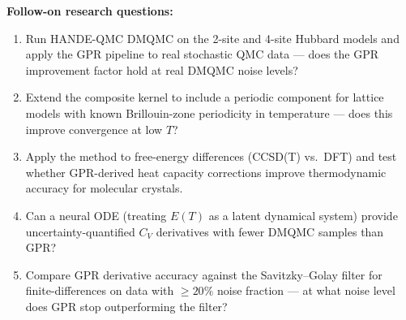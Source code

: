 \noindent\textbf{Follow-on research questions:}
\begin{enumerate}[leftmargin=1.6em,itemsep=0.2em,topsep=0.2em,label=Q\arabic*.]
\item Run HANDE-QMC DMQMC on the 2-site and 4-site Hubbard models and apply the GPR pipeline to real stochastic QMC data --- does the GPR improvement factor hold at real DMQMC noise levels?
\item Extend the composite kernel to include a periodic component for lattice models with known Brillouin-zone periodicity in temperature --- does this improve convergence at low $T$?
\item Apply the method to free-energy differences (CCSD(T) vs.\ DFT) and test whether GPR-derived heat capacity corrections improve thermodynamic accuracy for molecular crystals.
\item Can a neural ODE (treating $E(T)$ as a latent dynamical system) provide uncertainty-quantified $C_V$ derivatives with fewer DMQMC samples than GPR?
\item Compare GPR derivative accuracy against the Savitzky--Golay filter for finite-differences on data with $\geq 20\%$ noise fraction --- at what noise level does GPR stop outperforming the filter?
\end{enumerate}

